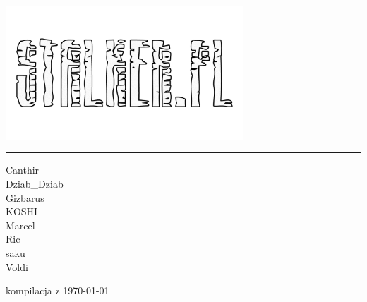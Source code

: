 \documentclass[MAIN.tex]{subfiles}
\begin{document}
\onecolumn
\vfil
\centering
\parbox[l] {.75\textwidth}{\includegraphics[height=13.56em, clip=true, trim= 60 176 60 176]{logo.png}}
\parbox[c]{.02\textwidth} {\color{BrickRed}\rule{.5ex}{13.56em}}
\parbox[l]{.1\textwidth}{%
Canthir\\
Dziab\_Dziab\\
Gizbarus\\
KOSHI\\
Marcel\\
Ric\\
saku\\
Voldi}
\vfil
kompilacja z \today
\twocolumn

\end{document}
